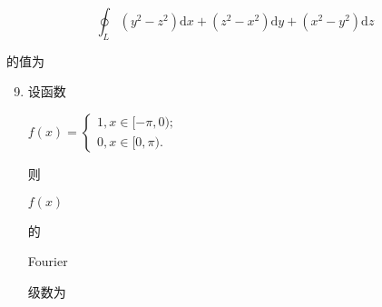 \documentclass[10pt]{article}
\begin{document}
\begin{enumerate}
\end{enumerate}
$$
\oint_{L}\left(y^{2}-z^{2}\right) \mathrm{d} x+\left(z^{2}-x^{2}\right) \mathrm{d} y+\left(x^{2}-y^{2}\right) \mathrm{d} z
$$
\begin{CJK}{UTF8}{mj}的值为\end{CJK}

\begin{enumerate}
  \setcounter{enumi}{8}
  \item \begin{CJK}{UTF8}{mj}设函数\end{CJK} $f(x)=\left\{\begin{array}{c}1, x \in[-\pi, 0) ; \\ 0, x \in[0, \pi) .\end{array}\right.$ \begin{CJK}{UTF8}{mj}则\end{CJK} $f(x)$ \begin{CJK}{UTF8}{mj}的\end{CJK} Fourier \begin{CJK}{UTF8}{mj}级数为\end{CJK}
\end{enumerate}
\end{document}
